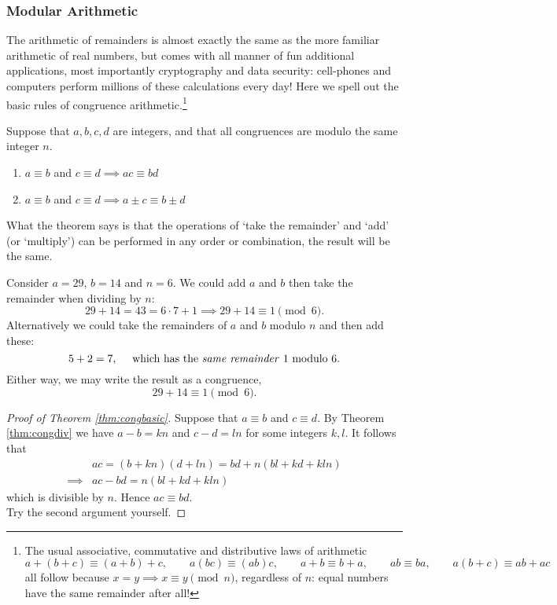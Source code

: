 \subsubsection*{Modular Arithmetic}

The arithmetic of remainders is almost exactly the same as the more familiar arithmetic of real numbers, but comes with all manner of fun additional applications, most importantly cryptography and data security: cell-phones and computers perform millions of these calculations every day! Here we spell out the basic rules of congruence arithmetic.\footnote{The usual associative, commutative and distributive laws of arithmetic
\[a+(b+c)\equiv (a+b)+c,\qquad a(bc)\equiv (ab)c,\qquad a+b\equiv b+a,\qquad ab\equiv ba,\qquad a(b+c)\equiv ab+ac\]
all follow because $x=y\implies x\equiv y\pmod n$, regardless of $n$: equal numbers have the same remainder after all!}

\begin{thm}\label{thm:congbasic}
Suppose that $a,b,c,d$ are integers, and that all congruences are modulo the same integer $n$. 
\begin{enumerate}\setlength{\itemsep}{0pt}
  \item $a\equiv b$ and $c\equiv d\implies ac\equiv bd$
  \item $a\equiv b$ and $c\equiv d\implies a\pm c\equiv b\pm d$
\end{enumerate}
\end{thm}

\noindent What the theorem says is that the operations of `take the remainder' and `add' (or `multiply') can be performed in any order or combination, the result will be the same.

\begin{example} 
Consider $a=29$, $b=14$ and $n=6$. We could add $a$ and $b$ then take the remainder when dividing by $n$:
\[29+14=43=6\cdot 7+1\implies 29+14\equiv 1\pmod 6.\]
Alternatively we could take the remainders of $a$ and $b$ modulo $n$ and then add these:
\[5+2=7,\quad\text{ which has the \emph{same remainder} 1 modulo 6.}\]
Either way, we may write the result as a congruence,
\[29+14\equiv 1\pmod 6.\]
\end{example}

\begin{proof}[Proof of Theorem \ref{thm:congbasic}]
Suppose that $a\equiv b$ and $c\equiv d$. By Theorem \ref{thm:congdiv} we have $a-b=kn$ and $c-d=ln$ for some integers $k,l$. It follows that
\begin{align*}
&ac=(b+kn)(d+ln)=bd+n(bl+kd+kln)\\
\implies &ac-bd=n(bl+kd+kln)
\end{align*}
which is divisible by $n$. Hence $ac\equiv bd$.\\
Try the second argument yourself.
\end{proof}

